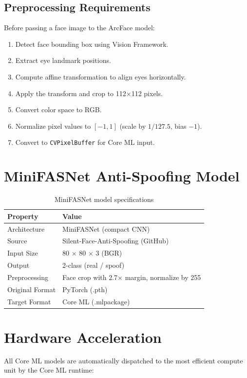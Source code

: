 \documentclass[12pt,a4paper]{report}
\begin{document}
\subsection{Preprocessing Requirements}
Before passing a face image to the ArcFace model:
\begin{enumerate}[noitemsep]
    \item Detect face bounding box using Vision Framework.
    \item Extract eye landmark positions.
    \item Compute affine transformation to align eyes horizontally.
    \item Apply the transform and crop to 112$\times$112 pixels.
    \item Convert color space to RGB.
    \item Normalize pixel values to $[-1, 1]$ (scale by $1/127.5$, bias $-1$).
    \item Convert to \texttt{CVPixelBuffer} for Core ML input.
\end{enumerate}

\section{MiniFASNet Anti-Spoofing Model}
\begin{table}[H]
\centering
\begin{tabular}{ll}
\toprule
\textbf{Property} & \textbf{Value} \\
\midrule
Architecture & MiniFASNet (compact CNN) \\
Source & Silent-Face-Anti-Spoofing (GitHub) \\
Input Size & 80 $\times$ 80 $\times$ 3 (BGR) \\
Output & 2-class (real / spoof) \\
Preprocessing & Face crop with 2.7$\times$ margin, normalize by 255 \\
Original Format & PyTorch (.pth) \\
Target Format & Core ML (.mlpackage) \\
\bottomrule
\end{tabular}
\caption{MiniFASNet model specifications}
\end{table}

\section{Hardware Acceleration}
All Core ML models are automatically dispatched to the most efficient compute unit by the Core ML runtime:
\end{document}
